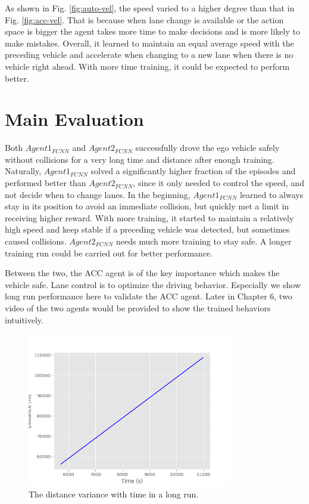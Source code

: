 As shown in Fig. \ref{fig:auto-vel}, the speed varied to a higher degree than that in Fig. \ref{fig:acc-vel}. That is because when lane change is available or the action space is bigger the agent takes more time to make decisions and is more likely to make mistakes. Overall, it learned to maintain an equal average speed with the preceding vehicle and accelerate when changing to a new lane when there is no vehicle right ahead. With more time training, it could be expected to perform better.

\section{Main Evaluation}

Both $Agent1_{FCNN}$ and $Agent2_{FCNN}$ successfully drove the ego vehicle safely without collisions for a very long time and distance after enough training. Naturally, $Agent1_{FCNN}$ solved a significantly higher fraction of the episodes and performed better than $Agent2_{FCNN}$, since it only needed to control the speed, and not decide when to change lanes. In the beginning, $Agent1_{FCNN}$ learned to always stay in its position to avoid an immediate collision, but quickly met a limit in receiving higher reward. With more training, it started to maintain a relatively high speed and keep stable if a preceding vehicle was detected, but sometimes caused collisions. $Agent2_{FCNN}$ needs much more training to stay safe. A longer training run could be carried out for better performance.

Between the two, the ACC agent is of the key importance which makes the vehicle safe. Lane control is to optimize the driving behavior. Especially we show long run performance here to validate the ACC agent. Later in Chapter 6, two video of the two agents would be provided to show the trained behaviors intuitively.

 \begin{figure}[h]
\centering
\includegraphics[width=0.8\textwidth]{figs/ch5/long_distance_variance}
\caption{The distance variance with time in a long run.}
\label{fig:long_distance_variance}
\end{figure}

